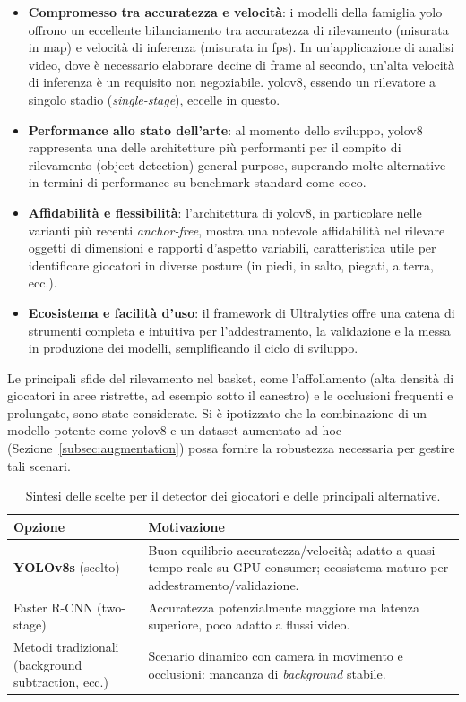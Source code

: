 \documentclass[12pt,a4paper,openright,twoside]{book}
\begin{document}
\begin{itemize}
  \item \textbf{Compromesso tra accuratezza e velocità}: i modelli della 
  famiglia \ac{yolo} offrono un eccellente bilanciamento tra accuratezza 
  di rilevamento (misurata in \ac{map}) e velocità di inferenza (misurata 
  in \ac{fps}). In un'applicazione di analisi video, dove è necessario 
  elaborare decine di frame al secondo, un'alta velocità di inferenza è 
  un requisito non negoziabile. \ac{yolo}v8, essendo un rilevatore a 
  singolo stadio (\emph{single-stage}), eccelle in questo.
  \item \textbf{Performance allo stato dell'arte}: al momento dello 
  sviluppo, \ac{yolo}v8 rappresenta una delle architetture più performanti 
  per il compito di rilevamento (object detection) general-purpose, 
  superando molte alternative in termini di performance su benchmark 
  standard come \ac{coco}.
  \item \textbf{Affidabilità e flessibilità}: l'architettura di \ac{yolo}v8, 
  in particolare nelle varianti più recenti \emph{anchor-free}, mostra 
  una notevole affidabilità nel rilevare oggetti di dimensioni e rapporti 
  d'aspetto variabili, caratteristica utile per identificare giocatori in 
  diverse posture (in piedi, in salto, piegati, a terra, ecc.).
  \item \textbf{Ecosistema e facilità d'uso}: il framework di Ultralytics 
  offre una catena di strumenti completa e intuitiva per 
  l'addestramento, la validazione e la messa in produzione dei modelli, 
  semplificando il ciclo di sviluppo.
\end{itemize}

Le principali sfide del rilevamento nel basket, come l'affollamento 
(alta densità di giocatori in aree ristrette, ad esempio sotto il canestro)
e le occlusioni frequenti e prolungate, sono state considerate. 
Si è ipotizzato che la combinazione di un modello potente come \ac{yolo}v8 
e un dataset aumentato ad hoc (Sezione~\ref{subsec:augmentation}) possa 
fornire la robustezza necessaria per gestire tali scenari.

\begin{table}[h]
  \centering
  \caption{Sintesi delle scelte per il detector dei giocatori e delle 
  principali alternative.}
  \label{tab:scelte_detector}
  \begin{tabularx}{\textwidth}{l X}
    \toprule
    \textbf{Opzione} & \textbf{Motivazione} \\
    \midrule
    \textbf{YOLOv8s} (scelto) & Buon equilibrio accuratezza/velocità; 
    adatto a quasi tempo reale su GPU consumer; ecosistema maturo per 
    addestramento/validazione. \\
    Faster R-CNN (two-stage) & Accuratezza potenzialmente maggiore ma 
    latenza superiore, poco adatto a flussi video. \\
    Metodi tradizionali (background subtraction, ecc.) & Scenario dinamico 
    con camera in movimento e occlusioni: mancanza di \emph{background} stabile. \\
    \bottomrule
  \end{tabularx}
\end{table}
\end{document}
